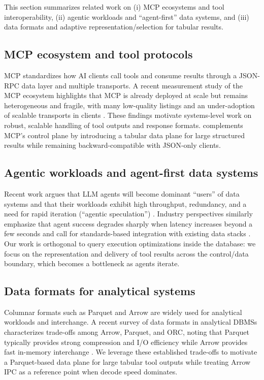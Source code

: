 \label{sec:related}

This section summarizes related work on (i) MCP ecosystems and tool interoperability, (ii) agentic workloads and ``agent-first'' data systems, and (iii) data formats and adaptive representation/selection for tabular results.

\subsection{MCP ecosystem and tool protocols}
MCP standardizes how AI clients call tools and consume results through a JSON-RPC data layer and multiple transports. A recent measurement study of the MCP ecosystem highlights that MCP is already deployed at scale but remains heterogeneous and fragile, with many low-quality listings and an under-adoption of scalable transports in clients \cite{guoMcpEcosystemMeasurement}. These findings motivate systems-level work on robust, scalable handling of tool outputs and response formats. \system complements MCP’s control plane by introducing a tabular data plane for large structured results while remaining backward-compatible with JSON-only clients.

\subsection{Agentic workloads and agent-first data systems}
Recent work argues that LLM agents will become dominant ``users'' of data systems and that their workloads exhibit high throughput, redundancy, and a need for rapid iteration (``agentic speculation'') \cite{liuAgentFirstOverlords}. Industry perspectives similarly emphasize that agent success degrades sharply when latency increases beyond a few seconds and call for standards-based integration with existing data stacks \cite{fireboltAgentsWhitepaper}. Our work is orthogonal to query execution optimizations inside the database: we focus on the representation and delivery of tool results across the control/data boundary, which becomes a bottleneck as agents iterate.

\subsection{Data formats for analytical systems}
Columnar formats such as Parquet and Arrow are widely used for analytical workloads and interchange. A recent survey of data formats in analytical DBMSs characterizes trade-offs among Arrow, Parquet, and ORC, noting that Parquet typically provides strong compression and I/O efficiency while Arrow provides fast in-memory interchange \cite{liuDataFormatsVldbj2025}. We leverage these established trade-offs to motivate a Parquet-based data plane for large tabular tool outputs while treating Arrow IPC as a reference point when decode speed dominates.

